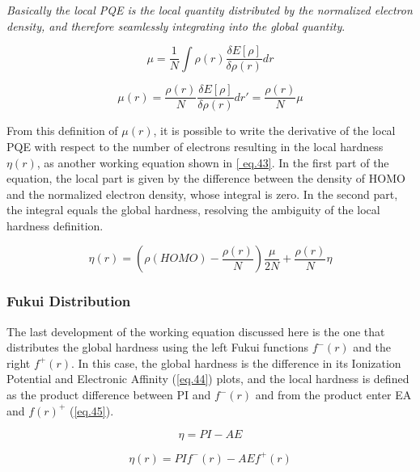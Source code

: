 \documentclass[a4paper,11pt]{refart}
\begin{document}
	\emph{Basically the local PQE is the local quantity distributed by the normalized electron density, and therefore seamlessly integrating into the global quantity}.


	\begin{equation}
	\mu = \frac{1}{N} \int \rho(r) \frac{\delta E[\rho]}{\delta \rho(r)} dr
	\label{eq.41}
	\end{equation}

	\begin{equation}
	\mu(r) = \frac{\rho(r)}{N} \frac{\delta E[\rho]}{\delta \rho(r)} dr' = \frac{\rho(r)} {N} \mu
	\label{eq.42}
	\end{equation}

	From this definition of $\mu(r)$, it is possible to write the derivative of the local PQE with respect to the number of electrons resulting in the local hardness $\eta(r)$, as another working equation shown in \autoref{ eq.43}. In the first part of the equation, the local part is given by the difference between the density of HOMO and the normalized electron density, whose integral is zero. In the second part, the integral equals the global hardness, resolving the ambiguity of the local hardness definition.

	\begin{equation}
	\eta(r) = \left (\rho(HOMO) - \frac{\rho(r)}{N} \right) \frac{\mu}{2N} + \frac{\rho(r)}{N}\eta
	\label{eq.43}
	\end{equation}

	\subsubsection{Fukui Distribution}

	The last development of the working equation discussed here is the one that distributes the global hardness using the left Fukui functions $f^-(r)$ and the right $f^+(r)$. In this case, the global hardness is the difference in its Ionization Potential and Electronic Affinity (\autoref{eq.44}) plots, and the local hardness is defined as the product difference between PI and $f^-(r)$ and from the product enter EA and $f(r)^+$ (\autoref{eq.45}).

	\begin{equation}
	\eta = PI - AE
	\label{eq.44}
	\end{equation}

	\begin{equation}
	\eta(r) = PI f^-(r) - AE f^+(r)
	\label{eq.45}
	\end{equation}
\end{document}
